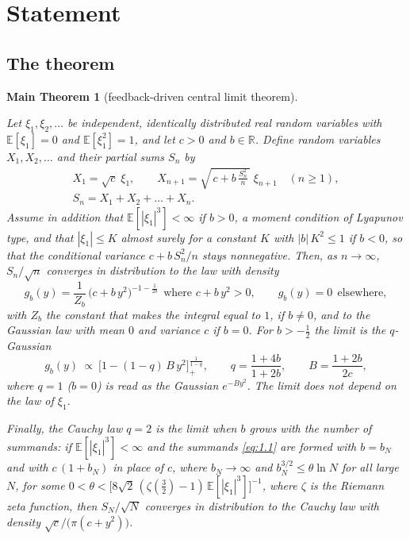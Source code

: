 \documentclass[aip,jmp,preprint,onecolumn,floatfix,superscriptaddress,nofootinbib,11pt]{revtex4-2}
\theoremstyle{plain}
\newtheorem*{maintheorem}{Main Theorem}
\theoremstyle{remark}
\numberwithin{equation}{section}
\newcommand{\E}{\mathbb{E}}
\begin{document}
\section{Statement}\label{sec:1}
 
\subsection{The theorem}\label{sec:1_1}
 
\begin{maintheorem}[feedback-driven central limit theorem]\label{MainTheorem}
 
Let $\xi_1,\xi_2,\dots$ be independent, identically distributed real random variables with $\E[\xi_1]=0$ and $\E[\xi_1^{2}]=1$, and let $c>0$ and $b\in\mathbb R$. Define random variables $X_1,X_2,\dots$ and their partial sums $S_n$ by
%
\begin{equation}
\begin{gathered} X_1=\sqrt c\;\xi_1,\qquad X_{n+1}=\sqrt{\,c+b\,\frac{S_n^{2}}{n}\,}\;\xi_{n+1}\quad(n\ge1),\\[4pt] S_n=X_1+X_2+\dots+X_n . \end{gathered}
\label{eq:1.1}
\end{equation}
%
Assume in addition that $\E[|\xi_1|^{3}]<\infty$ if $b>0$, a moment condition of Lyapunov type, and that $|\xi_1|\le K$ almost surely for a constant $K$ with $|b|\,K^{2}\le1$ if $b<0$, so that the conditional variance $c+b\,S_n^{2}/n$ stays nonnegative. Then, as $n\to\infty$, $S_n/\sqrt n$ converges in distribution to the law with density
%
\begin{equation}
g_b(y)=\frac{1}{Z_b}\,\big(c+b\,y^{2}\big)^{-1-\frac{1}{2b}}\ \ \text{where } c+b\,y^{2}>0,\qquad g_b(y)=0\ \ \text{elsewhere},
\label{eq:1.2}
\end{equation}
%
with $Z_b$ the constant that makes the integral equal to $1$, if $b\ne0$, and to the Gaussian law with mean $0$ and variance $c$ if $b=0$. For $b>-\tfrac12$ the limit is the $q$-Gaussian
%
\begin{equation}
g_b(y)\ \propto\ \Big[1-(1-q)\,B\,y^{2}\Big]_{+}^{\frac{1}{1-q}},\qquad q=\frac{1+4b}{1+2b},\qquad B=\frac{1+2b}{2c},
\label{eq:1.3}
\end{equation}
%
where $q=1$ ($b=0$) is read as the Gaussian $e^{-By^{2}}$. The limit does not depend on the law of $\xi_1$.
 
Finally, the Cauchy law $q=2$ is the limit when $b$ grows with the number of summands: if $\E[|\xi_1|^{3}]<\infty$ and the summands \eqref{eq:1.1} are formed with $b=b_N$ and with $c\,(1+b_N)$ in place of $c$, where $b_N\to\infty$ and $b_N^{3/2}\le\theta\ln N$ for all large $N$, for some $0<\theta<\big[8\sqrt2\,(\zeta(\tfrac32)-1)\,\E[|\xi_1|^{3}]\big]^{-1}$, where $\zeta$ is the Riemann zeta function, then $S_N/\sqrt N$ converges in distribution to the Cauchy law with density $\sqrt c/\big(\pi(c+y^{2})\big)$.
 
\end{maintheorem}
 
\end{document}
